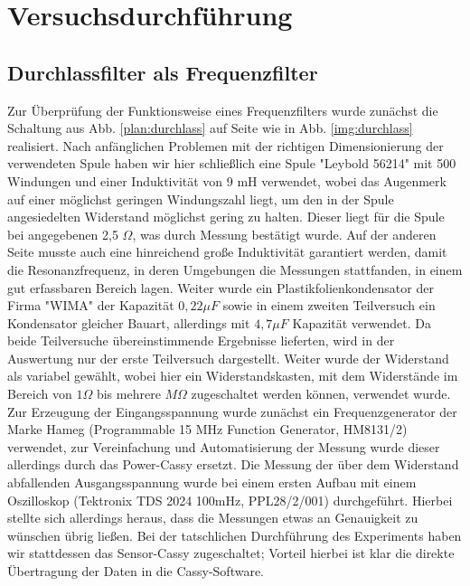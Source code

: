\section{Versuchsdurchführung}
\subsection{Durchlassfilter als Frequenzfilter}
Zur Überprüfung der Funktionsweise eines Frequenzfilters wurde zunächst die Schaltung aus
Abb. \ref{plan:durchlass} auf Seite \pageref{plan:durchlass} wie in Abb. \ref{img:durchlass} realisiert. Nach anfänglichen Problemen mit der richtigen Dimensionierung der verwendeten Spule haben wir hier schließlich eine Spule "Leybold 56214" mit 500 Windungen und einer Induktivität von 9 mH verwendet, wobei das Augenmerk auf einer möglichst geringen Windungszahl liegt, um den in der Spule angesiedelten Widerstand möglichst gering zu halten. Dieser liegt für die Spule bei angegebenen 2,5 $ \Omega $, was durch Messung bestätigt wurde. Auf
der anderen Seite musste auch eine hinreichend große Induktivität garantiert werden, damit die Resonanzfrequenz, in deren Umgebungen die Messungen stattfanden, in einem gut erfassbaren Bereich lagen. Weiter wurde ein Plastikfolienkondensator der Firma "WIMA" der Kapazität $ 0,22 \mu F $ sowie in einem zweiten Teilversuch ein Kondensator gleicher Bauart, allerdings mit $ 4,7 \mu F $ Kapazität verwendet. Da beide Teilversuche übereinstimmende Ergebnisse lieferten, wird in der Auswertung nur der erste Teilversuch dargestellt. Weiter wurde der Widerstand als variabel gewählt, wobei hier ein
Widerstandskasten, mit dem Widerstände im Bereich von $ 1\Omega $ bis mehrere $M \Omega $ zugeschaltet werden können, verwendet wurde. \\
Zur Erzeugung der Eingangsspannung wurde zunächst ein Frequenzgenerator der Marke Hameg (Programmable 15 MHz Function Generator, HM8131/2) verwendet, zur Vereinfachung und Automatisierung der Messung wurde dieser allerdings durch das Power-Cassy ersetzt.
Die Messung der über dem Widerstand abfallenden Ausgangsspannung wurde bei einem ersten Aufbau mit einem Oszilloskop (Tektronix TDS 2024 100mHz, PPL28/2/001) durchgeführt. Hierbei stellte sich allerdings heraus, dass die Messungen etwas an Genauigkeit zu wünschen übrig ließen. Bei der tatschlichen Durchführung des Experiments haben wir stattdessen das Sensor-Cassy zugeschaltet; Vorteil hierbei ist klar die direkte Übertragung der Daten in die Cassy-Software.

